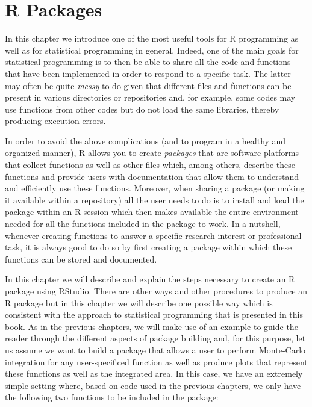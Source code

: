 \documentclass[12pt,]{krantz}
\begin{document}
\chapter{R Packages}\label{r-packages}

In this chapter we introduce one of the most useful tools for R
programming as well as for statistical programming in general. Indeed,
one of the main goals for statistical programming is to then be able to
share all the code and functions that have been implemented in order to
respond to a specific task. The latter may often be quite \emph{messy}
to do given that different files and functions can be present in various
directories or repositories and, for example, some codes may use
functions from other codes but do not load the same libraries, thereby
producing execution errors.

In order to avoid the above complications (and to program in a healthy
and organized manner), R allows you to create \emph{packages} that are
software platforms that collect functions as well as other files which,
among others, describe these functions and provide users with
documentation that allow them to understand and efficiently use these
functions. Moreover, when sharing a package (or making it available
within a repository) all the user needs to do is to install and load the
package within an R session which then makes available the entire
environment needed for all the functions included in the package to
work. In a nutshell, whenever creating functions to answer a specific
research interest or professional task, it is always good to do so by
first creating a package within which these functions can be stored and
documented.

In this chapter we will describe and explain the steps necessary to
create an R package using RStudio. There are other ways and other
procedures to produce an R package but in this chapter we will describe
one possible way which is consistent with the approach to statistical
programming that is presented in this book. As in the previous chapters,
we will make use of an example to guide the reader through the different
aspects of package building and, for this purpose, let us assume we want
to build a package that allows a user to perform Monte-Carlo integration
for any user-specificed function as well as produce plots that represent
these functions as well as the integrated area. In this case, we have an
extremely simple setting where, based on code used in the previous
chapters, we only have the following two functions to be included in the
package:
\end{document}

